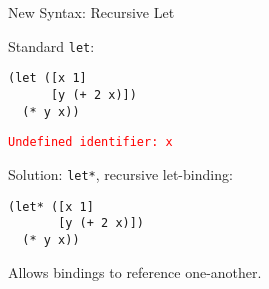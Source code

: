 \documentclass{beamer}
\begin{document}
\begin{frame}[fragile]{New Syntax: Recursive Let}

Standard \lstinline{let}:
\begin{lstlisting}
(let ([x 1]
      [y (+ 2 x)])
  (* y x))
\end{lstlisting}

\pause{} \vspace{0.25cm}

\textcolor{red}{\texttt{Undefined identifier: x}}

\pause{} \vspace{0.5cm}

Solution: \lstinline{let*}, recursive let-binding:

\begin{lstlisting}
(let* ([x 1]
       [y (+ 2 x)])
  (* y x))
\end{lstlisting}

Allows bindings to reference one-another.
\end{frame}
\end{document}
